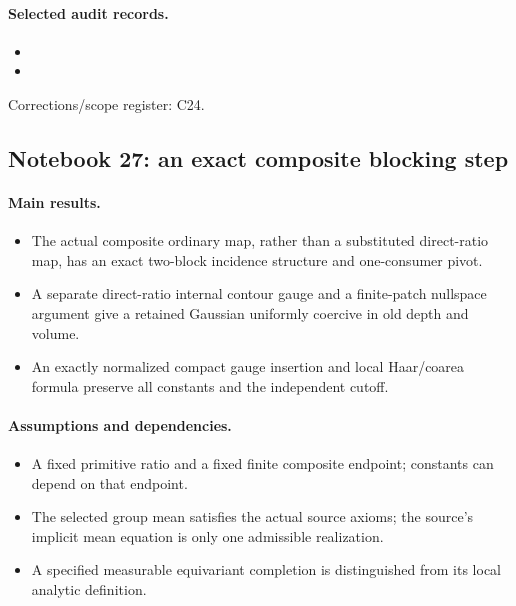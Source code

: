 \documentclass[11pt]{article}
\theoremstyle{remark}
\begin{document}
\paragraph{Selected audit records.}
\begingroup\small
\begin{itemize}
\item {}
\item {}
\end{itemize}
\endgroup
Corrections/scope register: C24.\par

\subsection{Notebook 27: an exact composite blocking step}
\label{hnc-27}
\noindent{}\par

\paragraph{Main results.}
\begin{itemize}
\item The actual composite ordinary map, rather than a substituted direct-ratio map, has an exact two-block incidence structure and one-consumer pivot.
\item A separate direct-ratio internal contour gauge and a finite-patch nullspace argument give a retained Gaussian uniformly coercive in old depth and volume.
\item An exactly normalized compact gauge insertion and local Haar/coarea formula preserve all constants and the independent cutoff.
\end{itemize}

\paragraph{Assumptions and dependencies.}
\begin{itemize}
\item A fixed primitive ratio and a fixed finite composite endpoint; constants can depend on that endpoint.
\item The selected group mean satisfies the actual source axioms; the source's implicit mean equation is only one admissible realization.
\item A specified measurable equivariant completion is distinguished from its local analytic definition.
\end{itemize}
\end{document}
